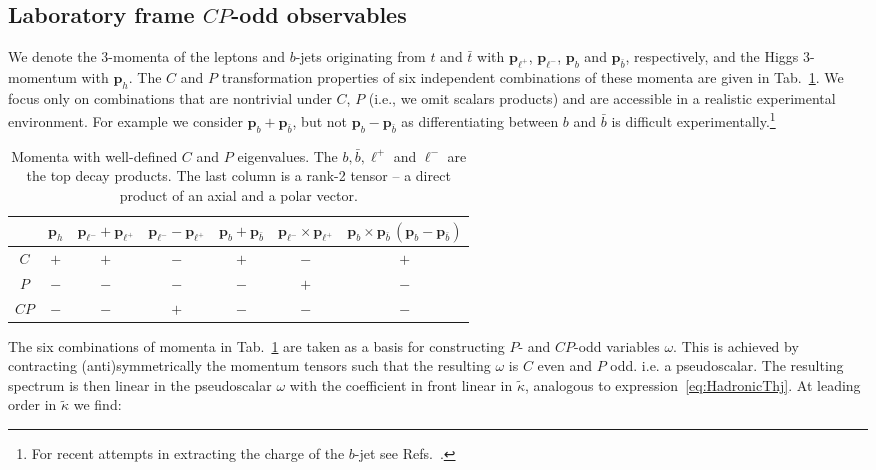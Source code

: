 \documentclass[11pt,a4paper]{article}
\newcommand{\lp}{\bm{p}_{\ell^+}}
\newcommand{\lm}{\bm{p}_{\ell^-}}
\renewcommand{\b}{\bm{p}_b}
\newcommand{\bbar}{\bm{p}_{\bar{b}}}
\newcommand{\h}{\bm{p}_h}
\begin{document}
\subsection{Laboratory frame $CP$-odd observables}
\label{sec:labFrameTTH}
 We denote the $3$-momenta of the leptons and $b$-jets originating from $t$ and $\bar{t}$ with $\lp$, $\lm$, $\b$ and $\bbar$, respectively, and the Higgs $3$-momentum with $\h$. The $C$ and $P$ transformation properties of six independent combinations of these momenta are given in Tab.~\ref{tab:CP_transformations_3_momenta}. We focus only on combinations that are nontrivial under $C$, $P$ (i.e., we omit scalars products) and are accessible in a realistic experimental environment. For example we consider $\b + \bbar$, but not $\b - \bbar$ as differentiating between $b$ and $\bar{b}$ is difficult experimentally.\footnote{For recent attempts in extracting the charge of the $b$-jet see Refs.~\cite{Krohn:2012fg, Fraser:2018ieu,ATLAS-2015-040,ATLAS:2018lhe}.}
\begin{table}[t!]
\begin{center}
	\begin{tabular}{c||c|c|c|c|c|c}		
          & $\h$ & $\lm+\lp$ & $\lm-\lp$ & $\b + \bbar$ & $\lm\times\lp$ & $\b \times \bbar\,(\b-\bbar)$\\
          \hline\hline
          $C$ & $+$ & $+$ & $-$ & $+$ & $-$ & $+$\\ 

         
          $P$ & $-$ & $-$ & $-$ & $-$ & $+$ & $-$ \\
          \hline\hline
          $CP$ & $-$ & $-$ & $+$ & $-$ & $-$& $-$ \\ 		
	\end{tabular} 
\end{center}
\caption{Momenta with well-defined $C$ and $P$ eigenvalues. The $b,\bar b, \ell^+$ and $\ell^-$ are the top decay products. The last column is a rank-2 tensor -- a direct product of an axial and a polar vector.}
\label{tab:CP_transformations_3_momenta}
\end{table}
The six combinations of momenta in Tab.~\ref{tab:CP_transformations_3_momenta} are taken as a basis for
constructing $P$- and $CP$-odd variables $\omega$. This is achieved
by contracting (anti)symmetrically the momentum tensors such that the resulting
$\omega$ is $C$ even and $P$ odd. i.e. a pseudoscalar. The resulting spectrum is then linear in the pseudoscalar $\omega$ with the coefficient in front linear in $\tilde \kappa$, analogous to expression~\eqref{eq:HadronicThj}. At leading order in $\tilde \kappa$ we find:
\end{document}
